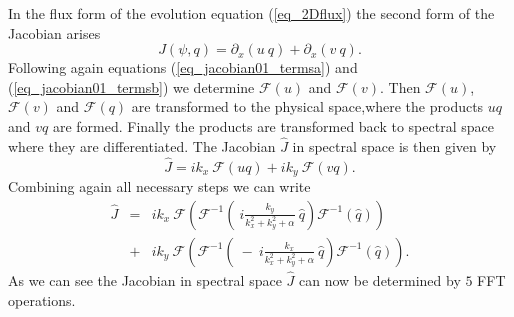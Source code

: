 In the flux form of the evolution equation ({\ref{eq_2Dflux}})
the second form of the Jacobian arises
\begin{equation} \label{eq_jacobian02}
  J(\psi,q)
   = 
  \partial_{x} (u \ q) 
   +
  \partial_{x} (v \ q).
\end{equation}
Following again equations (\ref{eq_jacobian01_termsa}) and 
(\ref{eq_jacobian01_termsb}) we determine $\mathcal{F}(u)$ and
$\mathcal{F}(v)$. Then $\mathcal{F}(u)$, $\mathcal{F}(v)$ and 
$\mathcal{F}(q)$ are transformed to the physical
space,where the products $uq$ and $vq$ are formed. Finally the
products are transformed back to spectral space where they 
are differentiated. The Jacobian $\hat{J}$ in spectral space is
then given by
\begin{equation} \label{eq_jacobian02_J}
  \hat{J}
   = 
  i  k_{x} \ \mathcal{F}(uq)
   + 
  i  k_{y} \ \mathcal{F}(vq).
\end{equation}
Combining again all necessary steps we can write
\begin{eqnarray} \nonumber
  \hat{J} 
   &=&
  ik_{x} \ 
  \mathcal{F}
   \left(
    \mathcal{F}^{-1} 
     \left(
     \ i \frac{k_{y}}{k^{2}_{x}+k^{2}_{y}+\alpha} \ 
      \hat{q}
     \right) 
     \mathcal{F}^{-1}
      \left( \hat{q} \right)
   \right)
    \\ \label{eq_jacobian02_Jall}
   &+&
  ik_{y} \ 
  \mathcal{F}
   \left(
    \mathcal{F}^{-1} 
     \left(
      \ - \ i \frac{k_{x}}{k^{2}_{x}+k^{2}_{y}+\alpha} \ 
      \hat{q}
     \right) 
     \mathcal{F}^{-1}
      \left( \hat{q} \right)
   \right).
\end{eqnarray}
As we can see the Jacobian in spectral space $\hat{J}$ can now be 
determined by $5$ FFT operations.


